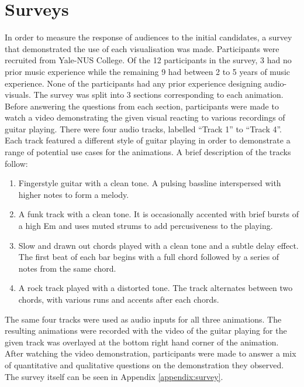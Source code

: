 \documentclass[../initial_thesis.tex]{subfiles}
\begin{document}
\section{Surveys}

In order to measure the response of audiences to the initial candidates, a survey that demonstrated the use of each visualisation was made. Participants were recruited from Yale-NUS College. Of the 12 participants in the survey, 3 had no prior music experience while the remaining 9 had between 2 to 5 years of music experience. None of the participants had any prior experience designing audio-visuals. The survey was split into 3 sections corresponding to each animation. Before answering the questions from each section, participants were made to watch a video demonstrating the given visual reacting to various recordings of guitar playing. There were four audio tracks, labelled ``Track 1'' to ``Track 4''. Each track featured a different style of guitar playing in order to demonstrate a range of potential use cases for the animations. A brief description of the tracks follow:

\begin{enumerate}
\item {Fingerstyle guitar with a clean tone. A pulsing bassline interspersed with higher notes to form a melody.} %
\item {A funk track with a clean tone. It is occasionally accented with brief bursts of a high Em and uses muted strums to add percusiveness to the playing.}
\item {Slow and drawn out chords played with a clean tone and a subtle delay effect. The first beat of each bar begins with a full chord followed by a series of notes from the same chord.}
\item {A rock track played with a distorted tone. The track alternates between two chords, with various runs and accents after each chords.}
\end{enumerate}

The same four tracks were used as audio inputs for all three animations. The resulting animations were recorded with the video of the guitar playing for the given track was overlayed at the bottom right hand corner of the animation. After watching the video demonstration, participants were made to answer a mix of quantitative and qualitative questions on the demonstration they observed. The survey itself can be seen in Appendix \ref{appendix:survey}. \par
\end{document}
